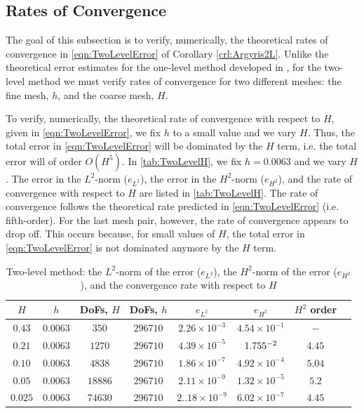 \subsection{Rates of Convergence}\label{sse:Rates}
The goal of this subsection is to verify, numerically, the theoretical rates of
convergence in \eqref{eqn:TwoLevelError} of Corollary \ref{crl:Argyris2L}. Unlike
the theoretical error estimates for the one-level method developed in
\cite{Foster}, for the two-level method we must verify rates of convergence
for two different meshes: the fine mesh, $h$, and the coarse mesh, $H$.

To verify, numerically, the theoretical rate of convergence with respect to $H$,
given in \eqref{eqn:TwoLevelError}, we fix $h$ to a small value and we vary $H$.
Thus, the total error in \eqref{eqn:TwoLevelError} will be dominated by the $H$
term, i.e. the total error will of order $O(H^5)$. In \autoref{tab:TwoLevelH},
we fix $h=0.0063$ and we vary $H$. The error in the $L^2$-norm ($e_{L^2}$), the
error in the $H^2$-norm ($e_{H^2}$), and the rate of convergence with respect to
$H$ are listed in \autoref{tab:TwoLevelH}. The rate of convergence follows the
theoretical rate predicted in \eqref{eqn:TwoLevelError} (i.e. fifth-order). For the
last mesh pair, however, the rate of convergence appears to drop off. This
occurs because, for small values of $H$, the total error in
\eqref{eqn:TwoLevelError} is not dominated anymore by the $H$ term.
\begin{table}
  \begin{center}
    \begin{tabular}{|c|c|c|c|c|c|c|c|}
    \hline
      $H$ &   $h$ &   DoFs, $ H $ & DoFs, $ h $ & $e_{L^2}$ & $e_{H^2}$ & $H^2$ order \\
      \hline
      $0.43$ & $0.0063$ & $350$ & $296710$ & $2.26\times 10^{-3}$ & $4.54\times
        10^{-1}$ & $-$ \\
      $0.21$ & $0.0063$ & $1270$ & $296710$ & $4.39\times 10^{-5}$ & $1.755\time
        10^{-2}$ & $4.45$ \\
      $0.10$ & $0.0063$ & $4838$ & $296710$ & $1.86\times 10^{-7}$ & $4.92\times
        10^{-4}$ & $5.04$ \\
      $0.05$ & $0.0063$ & $18886$ & $296710$ & $2.11\times 10^{-9}$ &
        $1.32\times 10^{-5}$ & $5.2$ \\
      $0.025$ & $0.0063$ & $74630$ & $296710$ & $2..18\times 10^{-9}$ &
        $6.02\times 10^{-7}$ & $4.45$ \\
      \hline
    \end{tabular}
  \end{center}
  \caption{Two-level method: the $L^2$-norm of the error ($e_{L^2}$), the
  $H^2$-norm of the error ($e_{H^2}$), and the convergence rate with respect to
  $H$}
  \label{tab:TwoLevelH}
\end{table}

